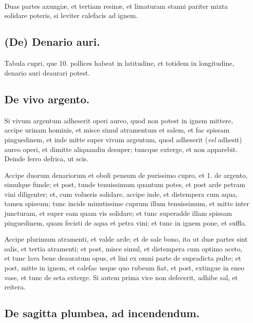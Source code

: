 \documentclass[a4paper, 11pt, oneside, polutonikogreek, italian]{article}
\begin{document}
\paragraph{}
Duas partes axungiæ, et tertiam resinæ, et limaturam stanni pariter mixta solidare poteris, si leviter calefacis ad ignem.

\subsection{(De) Denario auri.}
\paragraph{}
Tabula cupri, que 10. pollices habeat in latitudine, et totidem in longitudine, denario auri deaurari potest.

\subsection{De vivo argento.}
\paragraph{}
Si vivum argentum adheserit operi aureo, quod non potest in ignem mittere, accipe urinam hominis, et misce simul atramentum et salem, et fac spissam pinguedinem, et inde mitte super vivum argentum, quod adheserit (\emph{vel} adhesit) aureo operi, et dimitte aliquandiu desuper; tuncque exterge, et non apparebit. Deinde ferro defrica, ut scis.

Accipe duorum denariorum et oboli pensum de purissimo cupro, et 1. de argento, simulque funde; et post, tunde tenuissimum quantum potes, et post arde petram vini diligenter; et, cum volueris solidare, accipe inde, et distempera cum aqua, tamen spissum; tunc incide minutissime cuprum illum tenuissimum, et mitte inter juncturam, et super eam quam vis solidare; et tunc superadde illam spissam pinguedinem, quam fecisti de aqua et petra vini; et tunc in ignem pone, et suffla.

Accipe plurimum atramenti, et valde arde; et de sale bono, ita ut duæ partes sint salis, et tertia atramenti; et post, misce simul, et distempera cum optimo aceto, et tunc lava bene deauratum opus, et lini ex omni parte de supradicta pulte; et post, mitte in ignem, et calefac usque quo rubeum fiat, et post, extingue in eneo vase, et tunc de seta exterge. Si autem prima vice non defecerit, adhibe sal, et reitera.

\subsection{De sagitta plumbea, ad incendendum.}
\end{document}
